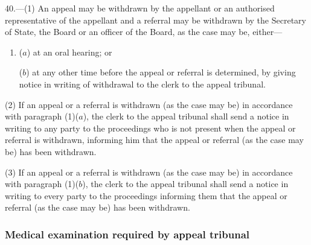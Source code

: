 \documentclass[12pt,a4paper]{article}
\begin{document}
40.—(1) An appeal may be withdrawn by the appellant or an authorised representative of the appellant and a referral may be withdrawn by the Secretary of State, 
the Board or an officer of the Board,   %
as the case may be, either—
\begin{enumerate}\item[]
($a$) at an oral hearing; or

($b$) at any other time before the appeal or referral is determined, by giving notice in writing of withdrawal to the clerk to the appeal tribunal.
\end{enumerate}

(2) If an appeal or a referral is withdrawn (as the case may be) in accordance with paragraph (1)($a$), the clerk to the appeal tribunal shall send a notice in writing to any party to the proceedings who is not present when the appeal or referral is withdrawn, informing him that the appeal or referral (as the case may be) has been withdrawn.

(3) If an appeal or a referral is withdrawn (as the case may be) in accordance with paragraph (1)($b$), the clerk to the appeal tribunal shall send a notice in writing to every party to the proceedings informing them that the appeal or referral (as the case may be) has been withdrawn.


\subsubsection[41. Medical examination required by appeal tribunal]
{Medical examination required by appeal tribunal}
\end{document}
